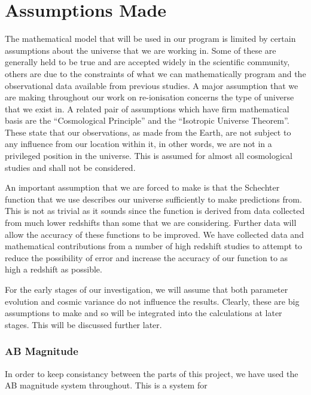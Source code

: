 
\section{Assumptions Made} %
\label{sec:assumptions_made}
	The mathematical model that will be used in our program is limited by certain assumptions about the universe that we are working in. Some of these are generally held to be true and are accepted widely in the scientific community, others are due to the constraints of what we can mathematically program and the observational data available from previous studies. A major assumption that we are making throughout our work on re-ionisation concerns the type of universe that we exist in. A related pair of assumptions which have firm mathematical basis are the ``Cosmological Principle'' and the ``Isotropic Universe Theorem''. These state that our observations, as made from the Earth, are not subject to any influence from our location within it, in other words, we are not in a privileged position in the universe. This is assumed for almost all cosmological studies and shall not be considered.

	An important assumption that we are forced to make is that the Schechter function that we use describes our universe sufficiently to make predictions from. This is not as trivial as it sounds since the function is derived from data collected from much lower redshifts than some that we are considering. Further data will allow the accuracy of these functions to be improved. We have collected data and mathematical contributions from a number of high redshift studies to attempt to reduce the possibility of error and increase the accuracy of our function to as high a redshift as possible.

	For the early stages of our investigation, we will assume that both parameter evolution and cosmic variance do not influence the results. Clearly, these are big assumptions to make and so will be integrated into the calculations at later stages. This will be discussed further later.

	\subsubsection{AB Magnitude} %
	\label{ssub:ab_magnitude}
		In order to keep consistancy between the parts of this project, we have used the AB magnitude system throughout. This is a system for

